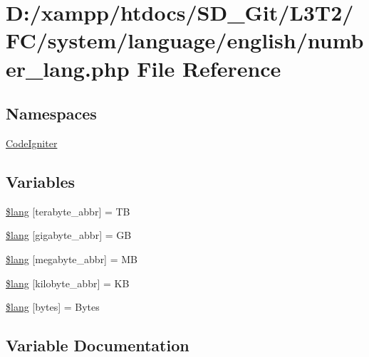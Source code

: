 \hypertarget{number__lang_8php}{}\section{D\+:/xampp/htdocs/\+S\+D\+\_\+\+Git/\+L3\+T2/\+F\+C/system/language/english/number\+\_\+lang.php File Reference}
\label{number__lang_8php}
\subsection*{Namespaces}
\begin{DoxyCompactItemize}
\item 
 \hyperlink{namespace_code_igniter}{Code\+Igniter}
\end{DoxyCompactItemize}
\subsection*{Variables}
\begin{DoxyCompactItemize}
\item 
\hyperlink{number__lang_8php_a72963402ca792afbae1ba34a4050fcde}{\$lang} \mbox{[}\textquotesingle{}terabyte\+\_\+abbr\textquotesingle{}\mbox{]} = \textquotesingle{}T\+B\textquotesingle{}
\item 
\hyperlink{number__lang_8php_a2349e7364cbc6402c44bd135b132d9d6}{\$lang} \mbox{[}\textquotesingle{}gigabyte\+\_\+abbr\textquotesingle{}\mbox{]} = \textquotesingle{}G\+B\textquotesingle{}
\item 
\hyperlink{number__lang_8php_ae1fdf8fb2977ddec5fd9f2237f277edc}{\$lang} \mbox{[}\textquotesingle{}megabyte\+\_\+abbr\textquotesingle{}\mbox{]} = \textquotesingle{}M\+B\textquotesingle{}
\item 
\hyperlink{number__lang_8php_a78200289bbf44dce8b0d5f06072379e6}{\$lang} \mbox{[}\textquotesingle{}kilobyte\+\_\+abbr\textquotesingle{}\mbox{]} = \textquotesingle{}K\+B\textquotesingle{}
\item 
\hyperlink{number__lang_8php_aeec8ade1229052ff8627a350480bba9c}{\$lang} \mbox{[}\textquotesingle{}bytes\textquotesingle{}\mbox{]} = \textquotesingle{}Bytes\textquotesingle{}
\end{DoxyCompactItemize}


\subsection{Variable Documentation}
\hypertarget{number__lang_8php_a72963402ca792afbae1ba34a4050fcde}{}
